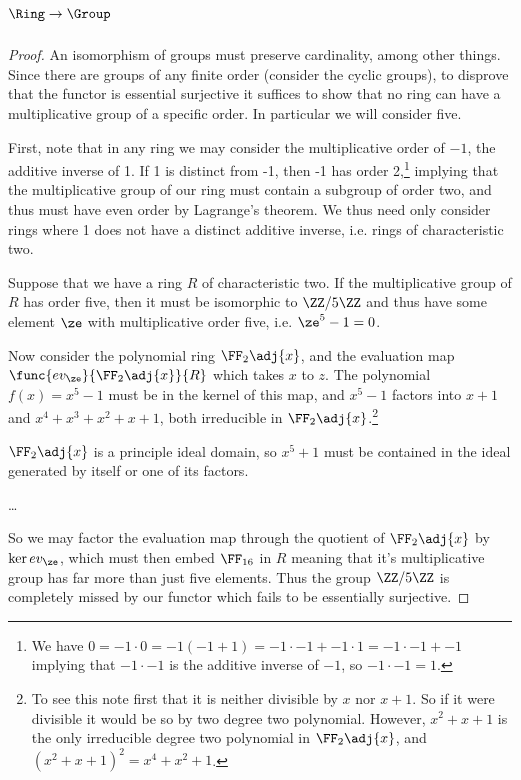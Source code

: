 \documentclass[../../main]{subfiles}
\begin{document}
\subparagraph{\(\Ring\to\Group\)}
\begin{proof}
	An isomorphism of groups must preserve cardinality, among other things.
	Since there are groups of any finite order (consider the cyclic groups), to
	disprove that the functor is essential surjective it suffices to show that
	no ring can have a multiplicative group of a specific order. In particular
	we will consider five.

	First, note that in any ring we may consider the multiplicative order of
	\(-1\), the additive inverse of 1. If 1 is distinct from -1, then -1 has
	order 2,\footnote{We have
		\(0=-1\cdot 0=-1(-1+1)=-1\cdot-1+-1\cdot1=-1\cdot-1+-1\) implying that
	\(-1\cdot-1\) is the additive inverse of \(-1\), so \(-1\cdot-1=1\).}
	implying that the multiplicative group of our ring must contain a subgroup
	of order two, and thus must have even order by Lagrange's theorem. We thus
	need only consider rings where 1 does not have a distinct additive inverse,
	i.e. rings of characteristic two.

	Suppose that we have a ring \(R\) of characteristic two. If the
	multiplicative group of \(R\) has order five, then it must be isomorphic to
	\(\ZZ/5\ZZ\) and thus have some element \(\ze\) with multiplicative order
	five, i.e. \(\ze^5-1=0\).

	Now consider the polynomial ring \(\FF_2\adj{x}\), and the evaluation map
	\(\func{ev_\ze}{\FF_2\adj{x}}{R}\) which takes \(x\) to \(z\). The
	polynomial \(f(x)=x^5-1\) must be in the kernel of this map, and \(x^5-1\)
	factors into \(x+1\) and \(x^4+x^3+x^2+x+1\), both irreducible in
	\(\FF_2\adj{x}\).\footnote{To see this note first that it is neither
		divisible by \(x\) nor \(x+1\). So if it were divisible it would be so
		by two degree two polynomial. However, \(x^2+x+1\) is the only
		irreducible degree two polynomial in \(\FF_2\adj{x}\), and
	\((x^2+x+1)^2=x^4+x^2+1\).}

	\(\FF_2\adj{x}\) is a principle ideal domain, so \(x^5+1\) must be contained
	in the ideal generated by itself or one of its factors.

	\dots


	So we may factor the evaluation map through the quotient of \(\FF_2\adj{x}\)
	by \(\ker ev_\ze\), which must then embed \(\FF_{16}\) in \(R\) meaning that
	it's multiplicative group has far more than just five elements. Thus the
	group \(\ZZ/5\ZZ\) is completely missed by our functor which fails to be
	essentially surjective.


\end{proof}
\end{document}
